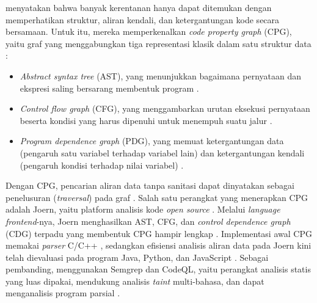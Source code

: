 \textcite{yamaguchi2014} menyatakan bahwa banyak kerentanan hanya dapat ditemukan
dengan memperhatikan struktur, aliran kendali, dan ketergantungan kode secara bersamaan.
Untuk itu, mereka memperkenalkan \textit{code property graph} (CPG),
yaitu graf yang menggabungkan tiga representasi klasik dalam satu struktur data \autocite{yamaguchi2014}:
\begin{itemize}
  \item \textit{Abstract syntax tree} (AST), yang menunjukkan bagaimana pernyataan dan ekspresi saling bersarang membentuk program \autocite{yamaguchi2014}.
  \item \textit{Control flow graph} (CFG), yang menggambarkan urutan eksekusi pernyataan beserta kondisi yang harus dipenuhi untuk menempuh suatu jalur \autocite{yamaguchi2014}.
  \item \textit{Program dependence graph} (PDG), yang memuat ketergantungan data (pengaruh satu variabel terhadap variabel lain)
  dan ketergantungan kendali (pengaruh kondisi terhadap nilai variabel) \autocite{yamaguchi2014}.
\end{itemize}

Dengan CPG, pencarian aliran data tanpa sanitasi dapat dinyatakan sebagai penelusuran (\textit{traversal}) pada graf \autocite{yamaguchi2015}.
Salah satu perangkat yang menerapkan CPG adalah Joern, yaitu platform analisis kode \textit{open source} \autocite{bakereffendi2025}.
Melalui \textit{language frontend}-nya, Joern menghasilkan AST, CFG, dan \textit{control dependence graph} (CDG) terpadu yang membentuk CPG hampir lengkap \autocite{bakereffendi2025}.
Implementasi awal CPG memakai \textit{parser} C/C++ \autocite{yamaguchi2014},
sedangkan efisiensi analisis aliran data pada Joern kini telah dievaluasi pada program Java, Python, dan JavaScript \autocite{bakereffendi2025}.
Sebagai pembanding, \textcite{bakereffendi2025} menggunakan Semgrep dan CodeQL,
yaitu perangkat analisis statis yang luas dipakai, mendukung analisis \textit{taint} multi-bahasa, dan dapat menganalisis program parsial \autocite{bakereffendi2025}.


